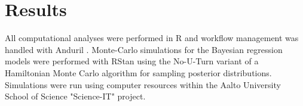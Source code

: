 
\section{Results}

All computational analyses were performed in R \citep{R} and workflow
management was handled with Anduril \citep{Ovaska2010}. Monte-Carlo
simulations for the Bayesian regression models were performed with RStan
\citep{RStan} using the No-U-Turn variant of a Hamiltonian Monte Carlo
algorithm for sampling posterior distributions. Simulations were run
using computer resources within the Aalto University School of Science
"Science-IT" project.

